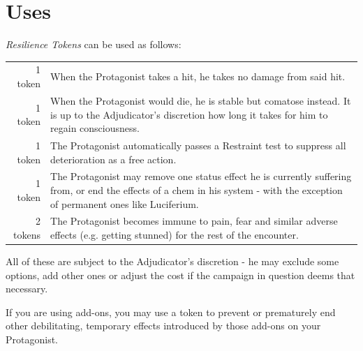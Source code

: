 \section{Uses}
\emph{Resilience Tokens} can be used as follows:
\par
\begin{tabularx}{\columnwidth}{rX}
	1 token & When the Protagonist takes a hit, he takes no damage from said hit. \\
	1 token & When the Protagonist would die, he is stable but comatose instead.
		It is up to the Adjudicator's discretion how long it takes for him to regain consciousness. \\
	1 token & The Protagonist automatically passes a Restraint test to suppress all deterioration as a free action. \\
	1 token & The Protagonist may remove one status effect he is currently suffering from, or end the effects of a chem in his system - with the exception of permanent ones like Luciferium. \\
	2 tokens & The Protagonist becomes immune to pain, fear and similar adverse effects (e.g. getting stunned) for the rest of the encounter.
\end{tabularx}
\par
All of these are subject to the Adjudicator's discretion
	- he may exclude some options, add other ones or adjust the cost
	if the campaign in question deems that necessary.
\begin{exampleblock}
	If you are using add-ons,
	you may use a token
	to prevent or prematurely end
	other debilitating, temporary effects introduced by those add-ons on your Protagonist.
\end{exampleblock}

